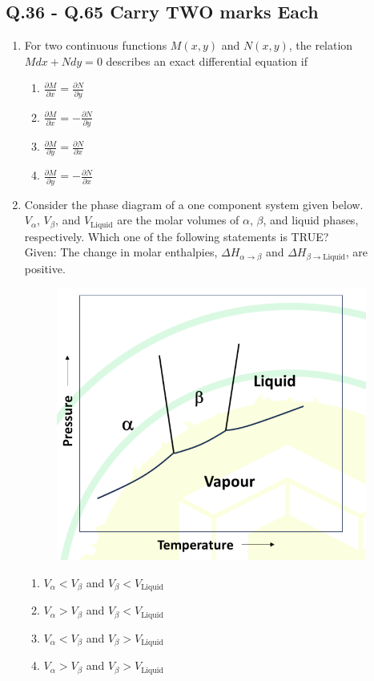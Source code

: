\documentclass[journal]{IEEEtran}
\theoremstyle{remark}
\begin{document}
\subsection*{Q.36 - Q.65 Carry TWO marks Each}
\begin{enumerate}[resume]
\item For two continuous functions $M(x, y)$ and $N(x, y)$, the relation $M dx + N dy = 0$ describes an exact differential equation if \hfill{}
\begin{multicols}{4}
\begin{enumerate}
\item $\frac{\partial M}{\partial x} = \frac{\partial N}{\partial y}$
\item $\frac{\partial M}{\partial x} = -\frac{\partial N}{\partial y}$
\item $\frac{\partial M}{\partial y} = \frac{\partial N}{\partial x}$
\item $\frac{\partial M}{\partial y} = -\frac{\partial N}{\partial x}$
\end{enumerate}
\end{multicols}

\item Consider the phase diagram of a one component system given below. \hfill{} \\
$V_\alpha$, $V_\beta$, and $V_{\text{Liquid}}$ are the molar volumes of $\alpha$, $\beta$, and liquid phases, respectively. Which one of the following statements is TRUE? \\
Given: The change in molar enthalpies, $\Delta H_{\alpha \to \beta}$ and $\Delta H_{\beta \to \text{Liquid}}$, are positive.
\begin{figure}[H]
    \centering
    \includegraphics[width=0.3\columnwidth]{figs/Q.37.png}
    \caption{}
    \label{fig.placeholder}
\end{figure}
\begin{enumerate}
\item $V_\alpha < V_\beta$ and $V_\beta < V_{\text{Liquid}}$
\item $V_\alpha > V_\beta$ and $V_\beta < V_{\text{Liquid}}$
\item $V_\alpha < V_\beta$ and $V_\beta > V_{\text{Liquid}}$
\item $V_\alpha > V_\beta$ and $V_\beta > V_{\text{Liquid}}$
\end{enumerate}


\end{enumerate}
\end{document}
